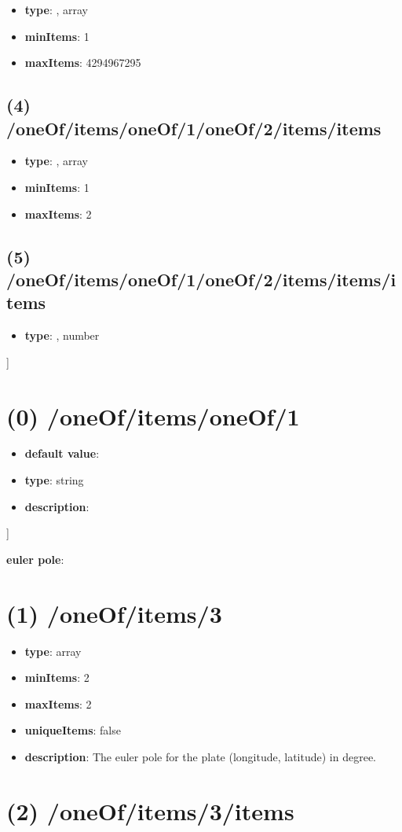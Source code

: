 \begin{itemize}[leftmargin=3em]\item {\bf type}: , array\item {\bf minItems}: 1
\item {\bf maxItems}: 4294967295
\end{itemize}\subsection{(4) /oneOf/items/oneOf/1/oneOf/2/items/items}
\begin{itemize}[leftmargin=4em]\item {\bf type}: , array\item {\bf minItems}: 1
\item {\bf maxItems}: 2
\end{itemize}\subsection{(5) /oneOf/items/oneOf/1/oneOf/2/items/items/items}
\begin{itemize}[leftmargin=5em]\item {\bf type}: , number\end{itemize}]\section{(0) /oneOf/items/oneOf/1}
\begin{itemize}[leftmargin=0em]\item {\bf default value}: 
\item {\bf type}: string
\item {\bf description}: 
\end{itemize}]\item {\bf euler pole}: \section{(1) /oneOf/items/3}
\begin{itemize}[leftmargin=1em]\item {\bf type}: array
\item {\bf minItems}: 2
\item {\bf maxItems}: 2
\item {\bf uniqueItems}: false
\item {\bf description}: The euler pole for the plate (longitude, latitude) in degree.
\end{itemize}\section{(2) /oneOf/items/3/items}
